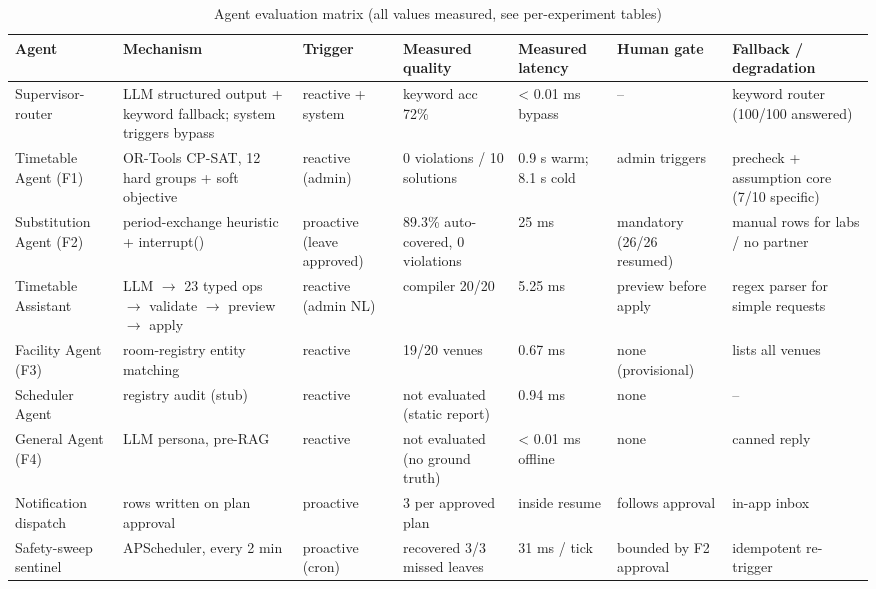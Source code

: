 \begin{table}[t]
\centering
\small
\begin{tabular}{lllllll}
\toprule
Agent & Mechanism & Trigger & Measured quality & Measured latency & Human gate & Fallback / degradation \\
\midrule
Supervisor-router & LLM structured output + keyword fallback; system triggers bypass & reactive + system & keyword acc 72\% & < 0.01 ms bypass & -- & keyword router (100/100 answered) \\
Timetable Agent (F1) & OR-Tools CP-SAT, 12 hard groups + soft objective & reactive (admin) & 0 violations / 10 solutions & 0.9 s warm; 8.1 s cold & admin triggers & precheck + assumption core (7/10 specific) \\
Substitution Agent (F2) & period-exchange heuristic + interrupt() & proactive (leave approved) & 89.3\% auto-covered, 0 violations & 25 ms & mandatory (26/26 resumed) & manual rows for labs / no partner \\
Timetable Assistant & LLM $\rightarrow$ 23 typed ops $\rightarrow$ validate $\rightarrow$ preview $\rightarrow$ apply & reactive (admin NL) & compiler 20/20 & 5.25 ms & preview before apply & regex parser for simple requests \\
Facility Agent (F3) & room-registry entity matching & reactive & 19/20 venues & 0.67 ms & none (provisional) & lists all venues \\
Scheduler Agent & registry audit (stub) & reactive & not evaluated (static report) & 0.94 ms & none & -- \\
General Agent (F4) & LLM persona, pre-RAG & reactive & not evaluated (no ground truth) & < 0.01 ms offline & none & canned reply \\
Notification dispatch & rows written on plan approval & proactive & 3 per approved plan & inside resume & follows approval & in-app inbox \\
Safety-sweep sentinel & APScheduler, every 2 min & proactive (cron) & recovered 3/3 missed leaves & 31 ms / tick & bounded by F2 approval & idempotent re-trigger \\
\bottomrule
\end{tabular}
\caption{Agent evaluation matrix (all values measured, see per-experiment tables)}
\label{tab:t1-master-matrix}
\end{table}
